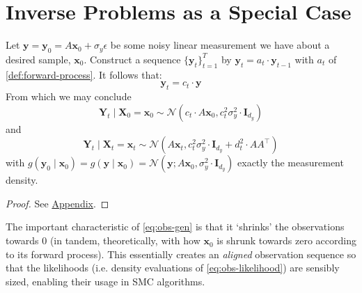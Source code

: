 \section{Inverse Problems as a Special Case} \label{sec:inv-prob-spec-case}

\begin{proposition} \label{prop:obs-gen}
    Let $\mathbf{y} = \mathbf{y}_0 = A\mathbf{x}_0 + \sigma_y\epsilon$ be some noisy linear
    measurement we have about a desired sample, $\mathbf{x}_0$. Construct a sequence
    $\{\mathbf{y}_t\}_{t=1}^T$ by $\mathbf{y}_t = a_t\cdot \mathbf{y}_{t-1}$ with $a_t$ of
    \autoref{def:forward-process}. It follows that:
    \begin{equation}
        \mathbf{y}_t = c_t\cdot \mathbf{y} \label{eq:obs-gen}
    \end{equation}
    From which we may conclude
    \begin{equation*}
        \mathbf{Y}_t \mid \mathbf{X}_0 = \mathbf{x}_0 \sim \mathcal{N}(c_t\cdot A\mathbf{x}_0, c_t^2\sigma_y^2\cdot \mathbf{I}_{d_y})
    \end{equation*}
    and
    \begin{equation}
        \mathbf{Y}_t \mid \mathbf{X}_t = \mathbf{x}_t \sim \mathcal{N}(A\mathbf{x}_t, c_t^2\sigma_y^2\cdot \mathbf{I}_{d_y} + d_t^2\cdot AA^\top) \label{eq:obs-likelihood}
    \end{equation}
    with $g(\mathbf{y}_0 \mid \mathbf{x}_0) = g(\mathbf{y} \mid \mathbf{x}_0) = \mathcal{N}(\mathbf{y}; A\mathbf{x}_0, \sigma_y^2\cdot \mathbf{I}_{d_y})$
    exactly the measurement density.
\end{proposition}

\begin{proof}
    See \hyperref[prf:obs-generation]{Appendix}.
\end{proof}

\begin{remark}[Shrinking] \label{rem:shrinking}
    The important characteristic of \autoref{eq:obs-gen} is that it `shrinks' the
    observations towards 0 (in tandem, theoretically, with how $\mathbf{x}_0$
    is shrunk towards zero according to its forward process). This essentially creates an
    \emph{aligned} observation sequence so that the likelihoods (i.e. density evaluations of
    \autoref{eq:obs-likelihood}) are sensibly sized, enabling their usage in SMC algorithms.
\end{remark}

